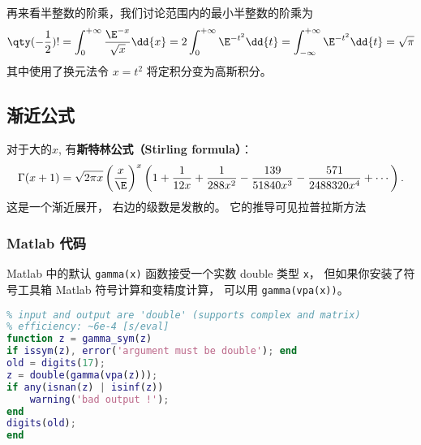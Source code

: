 再来看半整数的阶乘，我们讨论范围内的最小半整数的阶乘为 
\begin{equation}
\qty(-\frac12) ! = \int_0^{+\infty} \frac{\E^{-x}}{\sqrt x}\dd{x} = 2\int_0^{+\infty} \E^{-t^2} \dd{t} = \int_{-\infty}^{+\infty} \E^{-t^2} \dd{t} = \sqrt{\pi}
\end{equation}
其中使用了换元法令 $x = t^2$ 将定积分变为高斯积分。

\subsection{渐近公式}
对于大的$x$, 有\textbf{斯特林公式（Stirling formula）}：
$$
\Gamma(x+1)
  =\sqrt{2\pi x}\left({x\over \E}\right)^x
  \left(
   1
   +{1\over12x}
   +{1\over288x^2}
   -{139\over51840x^3}
   -{571\over2488320x^4}
   + \cdots
  \right).
$$
这是一个渐近展开， 右边的级数是发散的。 它的推导可见拉普拉斯方法

\subsubsection{Matlab 代码}
Matlab 中的默认 \verb|gamma(x)| 函数接受一个实数 double 类型 \verb|x|， 但如果你安装了符号工具箱 Matlab 符号计算和变精度计算， 可以用 \verb|gamma(vpa(x))|。
\begin{lstlisting}[language=matlab, caption=gamma\_sym.m]
% symbolic implementation of gamma function
% input and output are 'double' (supports complex and matrix)
% efficiency: ~6e-4 [s/eval]
function z = gamma_sym(z)
if issym(z), error('argument must be double'); end
old = digits(17);
z = double(gamma(vpa(z)));
if any(isnan(z) | isinf(z))
    warning('bad output !');
end
digits(old);
end
\end{lstlisting}
